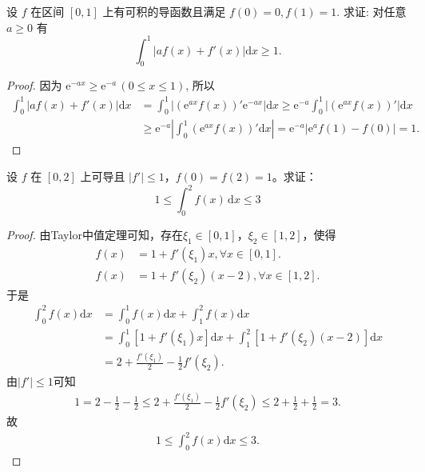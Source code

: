 \documentclass[../../main.tex]{subfiles}%
\begin{document}
\begin{example}
设 $f$ 在区间 $[0,1]$ 上有可积的导函数且满足 $f(0)=0,f(1)=1$. 求证: 对任意 $a\geqslant 0$ 有
$$\int_0^1|af(x)+f'(x)|\mathrm{d}x\geqslant 1.$$
\end{example}
\begin{proof}

因为 $\mathrm{e}^{-ax}\geqslant \mathrm{e}^{-a}\,(0\leqslant  x\leqslant 1)$, 所以
$$
\begin{aligned}
\int_0^1|af(x)+f'(x)|\mathrm{d}x &= \int_0^1|(\mathrm{e}^{ax}f(x))'\mathrm{e}^{-ax}|\mathrm{d}x \geqslant  \mathrm{e}^{-a}\int_0^1|(\mathrm{e}^{ax}f(x))'|\mathrm{d}x \\
&\geqslant  \mathrm{e}^{-a}\left|\int_0^1(\mathrm{e}^{ax}f(x))'\mathrm{d}x\right| = \mathrm{e}^{-a}|\mathrm{e}^{a}f(1)-f(0)| = 1.
\end{aligned}
$$

\end{proof}

\begin{example}
设 \( f \) 在 \([0,2]\) 上可导且 \(|f'| \leqslant 1\)，\( f(0) = f(2) = 1 \)。求证：
\[
1 \leqslant \int_{0}^{2} f(x) \, \mathrm{d}x \leqslant 3
\]
\end{example}
\begin{proof}

由Taylor中值定理可知，存在$\xi_1\in[0,1]$，$\xi_2\in[1,2]$，使得
\begin{align*}
f(x)&=1+f'(\xi_1)x,\forall x\in[0,1].\\
f(x)&=1+f'(\xi_2)(x-2),\forall x\in[1,2].
\end{align*}
于是
\begin{align*}
\int_0^2 f(x)\mathrm{d}x&=\int_0^1 f(x)\mathrm{d}x+\int_1^2 f(x)\mathrm{d}x\\
&=\int_0^1 [1+f'(\xi_1)x]\mathrm{d}x+\int_1^2 [1+f'(\xi_2)(x-2)]\mathrm{d}x\\
&=2+\frac{f'(\xi_1)}{2}-\frac{1}{2}f'(\xi_2).
\end{align*}
由$|f'|\leqslant1$可知
\begin{align*}
1=2-\frac{1}{2}-\frac{1}{2}\leqslant 2+\frac{f'(\xi_1)}{2}-\frac{1}{2}f'(\xi_2)\leqslant 2+\frac{1}{2}+\frac{1}{2}=3.
\end{align*}
故
\begin{align*}
1\leqslant \int_0^2 f(x)\mathrm{d}x\leqslant 3.
\end{align*}

\end{proof}
\end{document}
